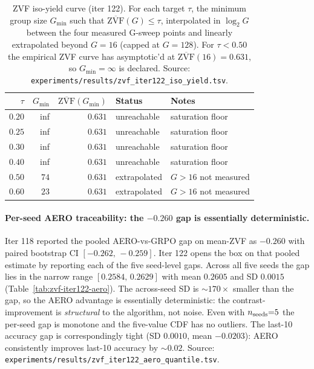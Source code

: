 \begin{table}[htbp]
\centering\small
\setlength{\tabcolsep}{4pt}
\begin{tabular}{rrrll}
\hline
$\tau$ & $G_{\min}$ & $\overline{\mathrm{ZVF}}(G_{\min})$ & Status & Notes \\
\hline
$0.20$ & inf & $0.631$ & unreachable & saturation floor \\
$0.25$ & inf & $0.631$ & unreachable & saturation floor \\
$0.30$ & inf & $0.631$ & unreachable & saturation floor \\
$0.40$ & inf & $0.631$ & unreachable & saturation floor \\
$0.50$ & $74$ & $0.631$ & extrapolated & $G>16$ not measured \\
$0.60$ & $23$ & $0.631$ & extrapolated & $G>16$ not measured \\
\hline
\end{tabular}
\caption{ZVF iso-yield curve (iter 122). For each target $\tau$, the
minimum group size $G_{\min}$ such that $\overline{\mathrm{ZVF}}(G) \le \tau$,
interpolated in $\log_2 G$ between the four measured G-sweep
points and linearly extrapolated beyond $G{=}16$ (capped at
$G{=}128$). For $\tau < 0.50$ the empirical ZVF curve has
asymptotic'd at $\overline{\mathrm{ZVF}}(16) = 0.631$, so $G_{\min} = \infty$ is
declared. Source:
\texttt{experiments/results/zvf\_iter122\_iso\_yield.tsv}.}
\label{tab:zvf-iter122-iso-yield}
\end{table}

\paragraph{Per-seed AERO traceability: the $-0.260$ gap is essentially deterministic.}
Iter 118 reported the pooled AERO-vs-GRPO gap on mean-ZVF as
$-0.260$ with paired bootstrap CI $[-0.262,\,-0.259]$. Iter 122
opens the box on that pooled estimate by reporting each of the
five seed-level gaps. Across all five seeds the gap lies in the
narrow range $[0.2584,\,0.2629]$ with mean $0.2605$ and SD
$0.0015$ (Table~\ref{tab:zvf-iter122-aero}). The across-seed
SD is $\sim\!170\times$ smaller than the gap, so the AERO
advantage is essentially deterministic: the contrast-improvement
is \emph{structural} to the algorithm, not noise. Even with
$n_{\rm seeds}{=}5$ the per-seed gap is monotone and the
five-value CDF has no outliers.
The last-10 accuracy gap is correspondingly tight
(SD $0.0010$, mean $-0.0203$): AERO consistently improves
last-10 accuracy by $\sim\!0.02$. Source:
\texttt{experiments/results/zvf\_iter122\_aero\_quantile.tsv}.


